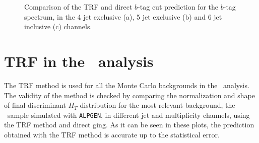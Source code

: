\begin{figure}[h!tb]\begin{center}
	\caption{Comparison of the TRF and direct $b$-tag cut prediction for the $b$-tag spectrum, in the 4 jet exclusive (a), 5 jet exclusive (b) and 6 jet inclusive (c) channels.\label{fig:btags}}
\end{center}\end{figure}


\section{TRF in the \htx\ analysis}

The TRF method is used for all the Monte Carlo backgrounds in the
\htx\ analysis. The validity of the method is checked by comparing 
the normalization and shape of final discriminant $H_T$ distribution
for the most relevant background, the \ttbar\ sample simulated with
\texttt{ALPGEN}, in different jet and \bjet multiplicity channels,
using the TRF method and direct \btag ging.
As it can be seen in these plots, the prediction obtained with the TRF 
method is accurate up to the statistical error.


